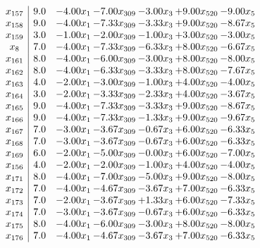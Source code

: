 \documentclass[8pt]{article}
\begin{document}
\[\begin{array}{c| c c@{\hskip 2pt} c@{\hskip 2pt} c@{\hskip 2pt} c@{\hskip 2pt} c@{\hskip 2pt} }
 x_{157}   &  9.0 & -4.00 x_{1} & -7.00 x_{309} & -3.00 x_{3} & +  9.00 x_{520} & -9.00 x_{5}\\
 x_{158}   &  9.0 & -4.00 x_{1} & -7.33 x_{309} & -3.33 x_{3} & +  9.00 x_{520} & -8.67 x_{5}\\
 x_{159}   &  3.0 & -1.00 x_{1} & -2.00 x_{309} & -1.00 x_{3} & +  3.00 x_{520} & -3.00 x_{5}\\
 x_{8}   &  7.0 & -4.00 x_{1} & -7.33 x_{309} & -6.33 x_{3} & +  8.00 x_{520} & -6.67 x_{5}\\
 x_{161}   &  8.0 & -4.00 x_{1} & -6.00 x_{309} & -3.00 x_{3} & +  8.00 x_{520} & -8.00 x_{5}\\
 x_{162}   &  8.0 & -4.00 x_{1} & -6.33 x_{309} & -3.33 x_{3} & +  8.00 x_{520} & -7.67 x_{5}\\
 x_{163}   &  4.0 & -2.00 x_{1} & -3.00 x_{309} & -1.00 x_{3} & +  4.00 x_{520} & -4.00 x_{5}\\
 x_{164}   &  3.0 & -2.00 x_{1} & -3.33 x_{309} & -2.33 x_{3} & +  4.00 x_{520} & -3.67 x_{5}\\
 x_{165}   &  9.0 & -4.00 x_{1} & -7.33 x_{309} & -3.33 x_{3} & +  9.00 x_{520} & -8.67 x_{5}\\
 x_{166}   &  9.0 & -4.00 x_{1} & -7.33 x_{309} & -1.33 x_{3} & +  9.00 x_{520} & -9.67 x_{5}\\
 x_{167}   &  7.0 & -3.00 x_{1} & -3.67 x_{309} & -0.67 x_{3} & +  6.00 x_{520} & -6.33 x_{5}\\
 x_{168}   &  7.0 & -3.00 x_{1} & -3.67 x_{309} & -0.67 x_{3} & +  6.00 x_{520} & -6.33 x_{5}\\
 x_{169}   &  6.0 & -2.00 x_{1} & -5.00 x_{309} & -0.00 x_{3} & +  6.00 x_{520} & -7.00 x_{5}\\
 x_{156}   &  4.0 & -2.00 x_{1} & -2.00 x_{309} & -1.00 x_{3} & +  4.00 x_{520} & -4.00 x_{5}\\
 x_{171}   &  8.0 & -4.00 x_{1} & -7.00 x_{309} & -5.00 x_{3} & +  9.00 x_{520} & -8.00 x_{5}\\
 x_{172}   &  7.0 & -4.00 x_{1} & -4.67 x_{309} & -3.67 x_{3} & +  7.00 x_{520} & -6.33 x_{5}\\
 x_{173}   &  7.0 & -2.00 x_{1} & -3.67 x_{309} & +  1.33 x_{3} & +  6.00 x_{520} & -7.33 x_{5}\\
 x_{174}   &  7.0 & -3.00 x_{1} & -3.67 x_{309} & -0.67 x_{3} & +  6.00 x_{520} & -6.33 x_{5}\\
 x_{175}   &  8.0 & -4.00 x_{1} & -6.00 x_{309} & -3.00 x_{3} & +  8.00 x_{520} & -8.00 x_{5}\\
 x_{176}   &  7.0 & -4.00 x_{1} & -4.67 x_{309} & -3.67 x_{3} & +  7.00 x_{520} & -6.33 x_{5}\\

\end{array}\]
\end{document}

